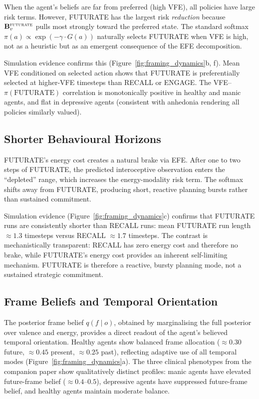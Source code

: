 \documentclass[11pt,a4paper]{article}
\begin{document}
When the agent's beliefs are far from preferred (high VFE), all policies have large risk terms. However, FUTURATE has the largest risk \emph{reduction} because $\mathbf{B}_v^{\textsc{futurate}}$ pulls most strongly toward the preferred state. The standard softmax $\pi(a) \propto \exp(-\gamma \cdot G(a))$ naturally selects FUTURATE when VFE is high, not as a heuristic but as an emergent consequence of the EFE decomposition.

Simulation evidence confirms this (Figure~\ref{fig:framing_dynamics}b, f). Mean VFE conditioned on selected action shows that FUTURATE is preferentially selected at higher-VFE timesteps than RECALL or ENGAGE. The VFE--$\pi(\text{FUTURATE})$ correlation is monotonically positive in healthy and manic agents, and flat in depressive agents (consistent with anhedonia rendering all policies similarly valued).

\subsection{Shorter Behavioural Horizons}\label{sec:short_horizon}

FUTURATE's energy cost creates a natural brake via EFE. After one to two steps of FUTURATE, the predicted interoceptive observation enters the ``depleted'' range, which increases the energy-modality risk term. The softmax shifts away from FUTURATE, producing short, reactive planning bursts rather than sustained commitment.

Simulation evidence (Figure~\ref{fig:framing_dynamics}c) confirms that FUTURATE runs are consistently shorter than RECALL runs: mean FUTURATE run length $\approx 1.3$ timesteps versus RECALL $\approx 1.7$ timesteps. The contrast is mechanistically transparent: RECALL has zero energy cost and therefore no brake, while FUTURATE's energy cost provides an inherent self-limiting mechanism. FUTURATE is therefore a reactive, bursty planning mode, not a sustained strategic commitment.

\subsection{Frame Beliefs and Temporal Orientation}\label{sec:frame_beliefs}

The posterior frame belief $q(f \mid o)$, obtained by marginalising the full posterior over valence and energy, provides a direct readout of the agent's believed temporal orientation. Healthy agents show balanced frame allocation ($\approx 0.30$ future, $\approx 0.45$ present, $\approx 0.25$ past), reflecting adaptive use of all temporal modes (Figure~\ref{fig:framing_dynamics}a). The three clinical phenotypes from the companion paper show qualitatively distinct profiles: manic agents have elevated future-frame belief ($\approx 0.4$--$0.5$), depressive agents have suppressed future-frame belief, and healthy agents maintain moderate balance.
\end{document}
